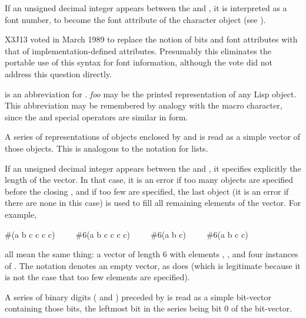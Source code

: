 \begin{flushdesc}
\begin{obsolete}
If an unsigned decimal integer appears between the \cd{\#} and \cd{{\Xbackslash}},
it is interpreted as a font number, to become the font attribute
of the character object (see ).
\end{obsolete}

\begin{newer}
X3J13 voted in March 1989 
to replace the notion of bits and font attributes with
that of implementation-defined attributes.  Presumably
this eliminates the portable use of this syntax for font information,
although the vote did not address this question directly.
\end{newer}

\item[\cd{\#'}]
 is an abbreviation for .
\emph{foo} may be the printed representation of any Lisp object.
This abbreviation may be remembered by analogy with the 
macro character, since the  and  special operators are
similar in form.

\item[\cd{\#(}]
A series of representations of objects enclosed by \cd{\#(} and \cd{)}
is read as a simple vector of those objects.  This is analogous to
the notation for lists.

If an unsigned decimal integer appears between the \cd{\#} and \cd{(},
it specifies explicitly the length of the vector.  In that case,
it is an error if too many objects are specified before the closing \cd{)},
and if too few are specified, the last object
(it is an error if there are none in this case)
is used to fill all
remaining elements of the vector.
For example,
\begin{lisp}
\#(a b c c c c)~~~~~\#6(a b c c c c)~~~~~\#6(a b c)~~~~~\#6(a b c c)
\end{lisp}
all mean the same thing: a vector of length 6 with elements , ,
and four instances of .  
The notation \cd{\#()} denotes an empty vector, as does 
(which is legitimate because it is not the case that too few elements
are specified).

\item[\cd{\#*}]
A series of binary digits ( and ) preceded by \cd{\#*} is
read as a simple bit-vector containing those bits, the leftmost bit
in the series being bit 0 of the bit-vector.


\end{flushdesc}

